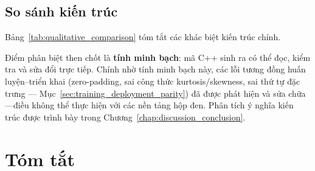 \subsection{So sánh kiến trúc}
\label{sec:qualitative_comparison}

Bảng~\ref{tab:qualitative_comparison} tóm tắt các khác biệt kiến trúc chính.

\begin{table}[H]
    \centering
    \caption{So sánh kiến trúc với các nền tảng thương mại}
    \label{tab:qualitative_comparison}
\end{table}

Điểm phân biệt then chốt là \textbf{tính minh bạch}: mã C++ sinh ra có thể đọc, kiểm tra và sửa đổi trực tiếp. Chính nhờ tính minh bạch này, các lỗi tương đồng huấn luyện--triển khai (zero-padding, sai công thức kurtosis/skewness, sai thứ tự đặc trưng --- Mục~\ref{sec:training_deployment_parity}) đã được phát hiện và sửa chữa---điều không thể thực hiện với các nền tảng hộp đen. Phân tích ý nghĩa kiến trúc được trình bày trong Chương~\ref{chap:discussion_conclusion}.

\section{Tóm tắt}
\label{sec:results_summary}


